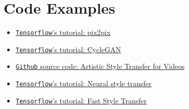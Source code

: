 \section{Code Examples}
\begin{itemize}
	\item \href{https://www.tensorflow.org/tutorials/generative/pix2pix}{\texttt{Tensorflow}'s tutorial: pix2pix}
	\item \href{https://www.tensorflow.org/tutorials/generative/cyclegan}{\texttt{Tensorflow}'s tutorial: CycleGAN}
	\item \href{https://github.com/manuelruder/artistic-videos}{\texttt{Github} source code: Artistic Style Transfer for Videos}
	\item \href{https://www.tensorflow.org/tutorials/generative/style_transfer}{\texttt{Tensorflow}'s tutorial: Neural style transfer}
	\item \href{https://www.tensorflow.org/hub/tutorials/tf2_arbitrary_image_stylization}{\texttt{Tensorflow}'s tutorial: Fast Style Transfer}
\end{itemize}

